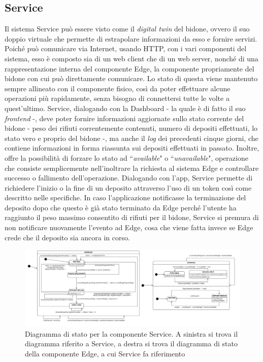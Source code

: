 \documentclass[a4paper, 12pt]{report}
\begin{document}
			\subsection{Service}
			Il sistema Service può essere visto come il \textit{digital twin} del bidone, ovvero il suo
			doppio virtuale che permette di estrapolare informazioni da esso e fornire servizi. Poiché
			può comunicare via Internet, usando HTTP, con i vari componenti del sistema, esso è composto
			sia di un web client che di un web server, nonché di una rappresentazione interna del
			componente Edge, la componente propriamente del bidone con cui può direttamente comunicare. Lo
			stato di questa viene mantenuto sempre allineato con il componente fisico, così da poter
			effettuare alcune operazioni più rapidamente, senza bisogno di connettersi tutte le volte
			a quest'ultimo. Service, dialogando con la Dashboard - la quale è di fatto il suo
			\textit{frontend} -, deve poter fornire informazioni aggiornate sullo stato corrente del
			bidone - peso dei rifiuti correntemente contenuti, numero di depositi effettuati, lo stato
			vero e proprio del bidone -, ma anche il \textit{log} dei precedenti cinque giorni, che
			contiene informazioni in forma riassunta sui depositi effettuati in passato. Inoltre, offre
			la possibilità di forzare lo stato ad ``\textit{available}" o ``\textit{unavailable}", 
			operazione che consiste semplicemente nell'inoltrare la richiesta al sistema Edge e 
			controllare successo o fallimento dell'operazione.\newline 
			Dialogando con l'app, Service permette di richiedere l'inizio o la fine di un
			deposito attraverso l'uso di un token così come descritto nelle specifiche. In caso
			l'applicazione notificasse la terminazione del deposito dopo che questo è già stato terminato
			da Edge perché l'utente ha raggiunto il peso massimo consentito di rifiuti per il bidone,
			Service si premura di non notificare nuovamente l'evento ad Edge, cosa che viene fatta invece se 
			Edge crede che il deposito sia ancora in corso.
			\begin{figure}[H]
				\centering
				\includegraphics[width=\textwidth]{"img/ServiceStatechart"}    
				\caption{Diagramma di stato per la componente Service. A sinistra si trova il diagramma riferito a Service, 
					a destra si trova il diagramma di stato della componente Edge, a cui Service fa riferimento}
			\end{figure}
\end{document}
